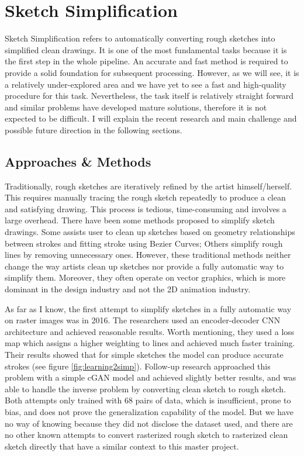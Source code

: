 \chapter{Sketch Simplification}

Sketch Simplification refers to automatically converting rough sketches into simplified clean drawings. It is one of the most fundamental tasks because it is the first step in the whole pipeline. An accurate and fast method is required to provide a solid foundation for subsequent processing. However, as we will see, it is a relatively under-explored area and we have yet to see a fast and high-quality procedure for this task. Nevertheless, the task itself is relatively straight forward and similar problems have developed mature solutions, therefore it is not expected to be difficult. I will explain the recent research and main challenge and possible future direction in the following sections.

\label{chapterlabel4}
\section{Approaches \& Methods}
Traditionally, rough sketches are iteratively refined by the artist himself/herself. This requires manually tracing the rough sketch repeatedly to produce a clean and satisfying drawing. This process is tedious, time-consuming and involves a large overhead. There have been some methods proposed to simplify sketch drawings. Some assists user to clean up sketches based on geometry relationships between strokes\cite{fiserShipShapeDrawingBeautification2015} and fitting stroke using Bezier Curves\cite{baeILoveSketchAsnaturalaspossibleSketching2008}; Others simplify rough lines by removing unnecessary ones\cite{liuClosureawareSketchSimplification2015}. However, these traditional methods neither change the way artists clean up sketches nor provide a fully automatic way to simplify them. Moreover, they often operate on vector graphics, which is more dominant in the design industry and not the 2D animation industry.

As far as I know, the first attempt to simplify sketches in a fully automatic way on raster images was in 2016\cite{simo-serraLearningSimplifyFully2016}. The researchers used an encoder-decoder CNN architecture and achieved reasonable results. Worth mentioning, they used a loss map which assigns a higher weighting to lines and achieved much faster training. Their results showed that for simple sketches the model can produce accurate strokes (see figure \ref{fig:learning2simp}). Follow-up research approached this problem with a simple cGAN model and achieved slightly better results\cite{simo-serraMasteringSketchingAdversarial2017}, and was able to handle the inverse problem by converting clean sketch to rough sketch. Both attempts only trained with 68 pairs of data, which is insufficient, prone to bias, and does not prove the generalization capability of the model. But we have no way of knowing because they did not disclose the dataset used, and there are no other known attempts  to convert rasterized rough sketch to rasterized clean sketch directly that have a similar context to this master project.


